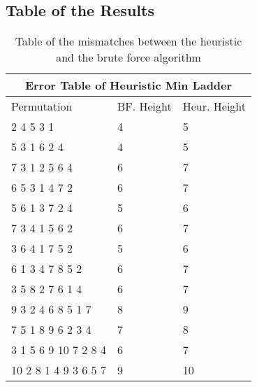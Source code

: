 \subsection{Table of the Results}
\begin{table}[!htp]
  \centering
     \begin{tabular}{|p{6cm}|p{2cm}|p{2cm}|}
        \hline
         \multicolumn{3}{|c|}{Error Table of Heuristic Min Ladder}\\
         \hline
        \hline 
         Permutation & BF. Height & Heur. Height\\ 
         \hline 
         2  4  5  3  1 & 4 & 5 \\ 
         \hline 
         5  3  1  6  2  4 & 4 & 5 \\ 
         \hline 
         7  3  1  2  5  6  4  & 6 & 7 \\ 
         \hline 
         6  5  3  1  4  7  2  & 6 & 7\\ 
         \hline 
         5  6  1  3  7  2  4  & 5 & 6 \\ 
         \hline 
         7  3  4  1  5  6  2  & 6 & 7 \\ 
         \hline 
         3  6  4  1  7  5  2 & 5 & 6 \\ 
         \hline 
          6  1  3  4  7  8  5  2 & 6 & 7\\ 
          \hline 
          3  5  8  2  7  6  1  4 & 6 & 7 \\ 
          \hline 
          9  3  2  4  6  8  5  1  7 & 8 & 9\\ 
          \hline 
           7  5  1  8  9  6  2  3  4 & 7 & 8 \\ 
           \hline 
            3  1  5  6  9  10  7  2  8  4 & 6 & 7 \\ 
            \hline 
          10  2  8  1  4  9  3  6  5  7 & 9 & 10 \\ 
         \hline
     \end{tabular}
     
      
     \caption{Table of the mismatches between the heuristic and the brute force algorithm}
     \label{Table:MinHeightFailures}
 \end{table}

 
